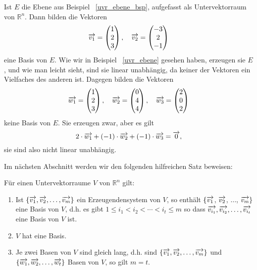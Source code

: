 \begin{beispiel}\label{uvr_ebene_erz} 
Ist $E$ die Ebene aus Beispiel ~\ref{uvr_ebene_bsp}, aufgefasst als Untervektorraum von $\mathbb R^n$. 
Dann bilden die Vektoren
  	$$ \overrightarrow{v_1} = \left( \begin{matrix} 1 \\ 2 \\ 3  \end{matrix} \right), \quad  
     	\overrightarrow{v_2} = \left( \begin{matrix} -3 \\ 2 \\ -1  \end{matrix} \right) $$
eine Basis von $E$. Wie wir in Beispiel ~\ref{uvr_ebene} gesehen haben, erzeugen sie $E$, und wie man leicht sieht, 
sind sie linear unabhängig, da keiner der Vektoren ein Vielfaches des anderen ist. Dagegen bilden die 
Vektoren
  	$$ \overrightarrow{w_1} = \left( \begin{matrix} 1 \\ 2 \\ 3 \end{matrix} \right), \quad  
    	\overrightarrow{w_2} = \left( \begin{matrix} 0 \\ 4 \\ 4  \end{matrix} \right), \quad 
     	\overrightarrow{w_3} = \left( \begin{matrix} 	2 \\ 0 \\ 2  \end{matrix} \right) $$
keine Basis von $E$. Sie erzeugen zwar, aber es gilt
  	$$ 2 \cdot \overrightarrow{w_1} + (-1) \cdot \overrightarrow{w_2} + (-1) \cdot \overrightarrow{w_3} = \overrightarrow{0}, $$
sie sind also nicht linear unabhängig.
\end{beispiel}

\medbreak

Im nächsten Abschnitt werden wir den folgenden hilfreichen Satz beweisen:

\begin{satz}\label{uvr_existenz_basis} 
Für einen Untervektorraume $V$ von $\mathbb R^n$ gilt:

\begin{enumerate}
\item Ist $\{\overrightarrow{v_1}, \overrightarrow{v_2}, \ldots, \overrightarrow{v_m} \}$ ein Erzeugendensystem 
von $V$, so enthält $\{ \overrightarrow{v_1}$, $\overrightarrow{v_2}$, $\ldots$, $\overrightarrow{v_m} \}$ eine 
Basis von $V$, d.h. es gibt $1 \leq i_1 < i_2 < \cdots < i_t \leq m$ so dass
$ \overrightarrow{v_{i_1}}, \overrightarrow{v_{i_2}}, \ldots, \overrightarrow{v_{i_t}}$ eine Basis von 
$V$ ist.
\item $V$ hat eine Basis.
\item Je zwei Basen von $V$ sind gleich lang, d.h. sind 
$\{\overrightarrow{v_1}, \overrightarrow{v_2}, \ldots, \overrightarrow{v_m} \}$ 
und $\{\overrightarrow{w_1}, \overrightarrow{w_2}, \ldots, \overrightarrow{w_t} \}$ Basen von $V$, so gilt
$m = t$.
\end{enumerate}
\end{satz}

